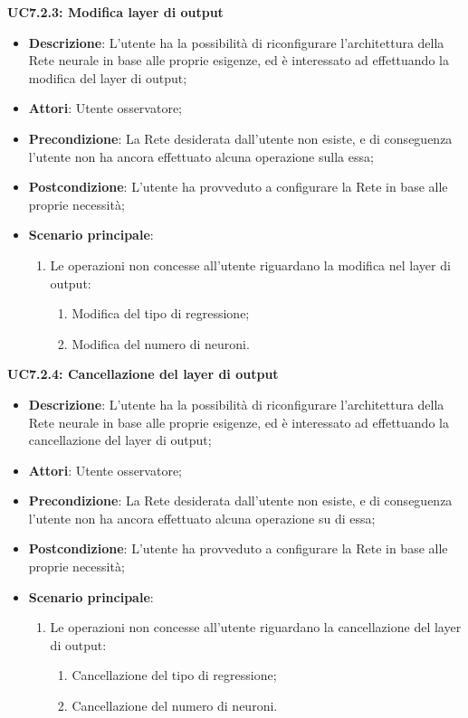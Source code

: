 \textbf{UC7.2.3: Modifica layer di output}
\label{UC7.2.3: Modifica layer di output}
\noindent
\begin{itemize}
\item \textbf{Descrizione}: L'utente ha la possibilit\`a di riconfigurare l'architettura della Rete neurale in base alle proprie esigenze, ed \`e interessato ad effettuando la modifica del layer di output;
\item \textbf{Attori}: Utente osservatore;
\item \textbf{Precondizione}: La Rete desiderata dall'utente non esiste, e di conseguenza l'utente non ha ancora effettuato alcuna operazione sulla essa;
\item \textbf{Postcondizione}: L'utente ha provveduto a configurare la Rete in base alle proprie necessit\`a;
\item \textbf{Scenario principale}:
\begin{enumerate}
\item Le operazioni non concesse all'utente riguardano la modifica nel layer di output:
\begin{enumerate}
\item Modifica del tipo di regressione;
\item Modifica del numero di neuroni.
\end{enumerate}
\end{enumerate}
\end{itemize}

\textbf{UC7.2.4: Cancellazione del layer di output}
\label{UC7.2.4: Cancellazione del layer di output}
\noindent
\begin{itemize}
\item \textbf{Descrizione}: L'utente ha la possibilit\`a di riconfigurare l'architettura della Rete neurale in base alle proprie esigenze, ed \`e interessato ad effettuando la cancellazione del layer di output;
\item \textbf{Attori}: Utente osservatore;
\item \textbf{Precondizione}: La Rete desiderata dall'utente non esiste, e di conseguenza l'utente non ha ancora effettuato alcuna operazione su di essa;
\item \textbf{Postcondizione}: L'utente ha provveduto a configurare la Rete in base alle proprie necessit\`a;
\item \textbf{Scenario principale}:
\begin{enumerate}
\item Le operazioni non concesse all'utente riguardano la cancellazione del layer di output:
\begin{enumerate}
\item Cancellazione del tipo di regressione;
\item Cancellazione del numero di neuroni.
\end{enumerate}
\end{enumerate}
\end{itemize}

